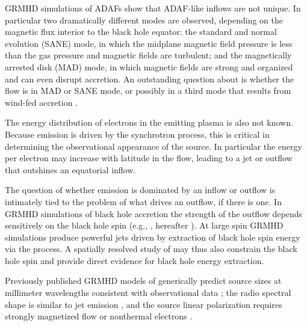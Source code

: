 GRMHD simulations of ADAFs show that ADAF-like inflows are not unique.
In particular two dramatically different modes are observed, depending on the magnetic flux interior to the black hole equator: the standard and normal evolution (SANE) mode, in which the midplane magnetic field pressure is less than the gas pressure and magnetic fields are turbulent; and the magnetically arrested disk (MAD) mode, in which magnetic fields are strong and organized and can even disrupt accretion.
An outstanding question about \sgra is whether the flow is in MAD or SANE mode, or possibly in a third mode that results from wind-fed accretion \citep{2020ApJ...896L...6R}.

The energy distribution of electrons in the emitting plasma is also not known.
Because emission is driven by the synchrotron process, this is critical in determining the observational appearance of the source.
In particular the energy per electron may increase with latitude in the flow, leading to a jet or outflow that outshines an equatorial inflow.

The question of whether emission is dominated by an inflow or outflow is intimately tied to the problem of what drives an outflow, if there is one.
In GRMHD simulations of black hole accretion the strength of the outflow depends sensitively on the black hole spin (e.g., \citealt{M87PaperV}, hereafter ).
At large spin GRMHD simulations produce powerful jets driven by extraction of black hole spin energy via the \citet{1977MNRAS.179..433B} process.
A spatially resolved study of \sgra may thus also constrain the black hole spin and provide direct evidence for black hole energy extraction.

Previously published GRMHD models of \sgra generically predict source sizes at millimeter wavelengths consistent with observational data \citep[e.g.,][]{2008Natur.455...78D, 2009ApJ...706..497M, 2009ApJ...703L.142D,2010ApJ...717.1092D};
the radio spectral shape is similar to jet emission \citep[e.g.,][]{2013A&A...559L...3M, 2017MNRAS.467.3604R}, and the source linear polarization requires strongly magnetized flow or nonthermal electrons \citep{2015Sci...350.1242J, 2017ApJ...837..180G, 2020MNRAS.494.4168D}.

